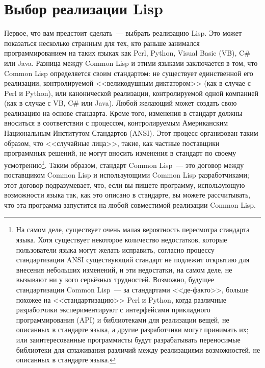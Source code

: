 \section{Выбор реализации Lisp}

Первое, что вам предстоит сделать~--- выбрать реализацию Lisp. Это может показаться
несколько странным для тех, кто раньше занимался программированием на таких языках как Perl,
Python, Visual Basic (VB), C\# или Java. Разница между Common Lisp и этими языками
заключается в том, что Common Lisp определяется своим стандартом: не существует
единственной его реализации, контролируемой <<великодушным диктатором>> (как в случае с Perl
и Python), или канонической реализации, контролируемой одной компанией (как в случае с VB,
C\# или Java). Любой желающий может создать свою реализацию на основе стандарта. Кроме
того, изменения в стандарт должны вноситься в соответствии с процессом, контролируемым
Американским Национальным Институтом Стандартов (ANSI). Этот процесс организован таким
образом, что <<случайные лица>>, такие, как частные поставщики программных решений, не могут
вносить изменения в стандарт по своему усмотрению\footnote{На самом деле, существует очень
  малая вероятность пересмотра стандарта языка. Хотя существует некоторое количество
  недостатков, которые пользователи языка могут желать исправить, согласно процессу
  стандартизации ANSI существующий стандарт не подлежит открытию для внесения небольших
  изменений, и эти недостатки, на самом деле, не вызывают ни у кого серьёзных
  трудностей. Возможно, будущее стандартизации Common Lisp~--- за стандартами <<де-факто>>,
  больше похожее на <<стандартизацию>> Perl и Python, когда различные разработчики
  экспериментируют с интерфейсами прикладного программирования (API) и библиотеками для
  реализации вещей, не описанных в стандарте языка, а другие разработчики могут принимать
  их; или заинтересованные программисты будут разрабатывать переносимые библиотеки для
  сглаживания различий между реализациями возможностей, не описанных в стандарте
  языка.}. Таким образом, стандарт Common Lisp~--- это договор между поставщиком Common
Lisp и использующими Common Lisp разработчиками; этот договор подразумевает, что, если вы
пишете программу, использующую возможности языка так, как это описано в стандарте, вы
можете рассчитывать, что эта программа запустится на любой совместимой реализации Common
Lisp.

